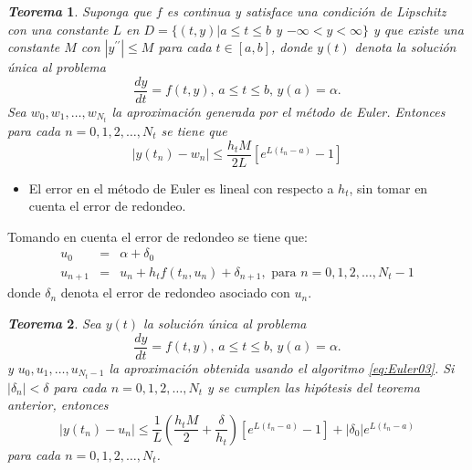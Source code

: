 \documentclass{beamer}
\newtheorem{teorema}{\textit{\textbf{Teorema}}}
\begin{document}
\begin{frame}

\begin{teorema}
Suponga que $f$ es continua y satisface una condición de Lipschitz con una constante $L$ en $D = \{(t,y) | a \leq t \leq b $ y $ -\infty < y < \infty \}$ y que existe una constante $M$ con $|y^{\prime\prime}| \leq M$ para cada $t \in [a,b]$, donde $y(t)$ denota la solución única al problema 
\begin{displaymath}
\dfrac{dy}{dt} = f(t,y), \, a \leq t \leq b, \, y(a) = \alpha .
\end{displaymath}
 Sea $w_0, w_1, \dots, w_{N_t}$ la aproximación generada por el método de Euler. Entonces para cada $n = 0,1,2, \dots , N_t$ se tiene que
\begin{displaymath}
|y(t_n) - w_n| \leq \dfrac{h_t M}{2 L} [e^{L(t_n - a) }-1 ]
\end{displaymath}

\end{teorema}

\begin{itemize}
	\item El error en el método de Euler es lineal con respecto a $h_t$, sin tomar en cuenta el error de redondeo.
\end{itemize}

\end{frame}

\begin{frame}

{\small 
Tomando en cuenta el error de redondeo se tiene que:
\begin{eqnarray}
u_0 & = & \alpha + \delta_0 \nonumber\\
u_{n+1} & = & u_n + h_t f(t_n, u_n) + \delta_{n+1}, \text{ para } n = 0, 1,2, \dots , N_t-1 \label{eq:Euler03}
\end{eqnarray}
donde $\delta_n$ denota el error de redondeo asociado con $u_n$.
}

\begin{teorema}
{\small
Sea $y(t)$ la solución única al problema 
\begin{displaymath}
\dfrac{dy}{dt} = f(t,y), \, a \leq t \leq b, \, y(a) = \alpha .
\end{displaymath}
y $u_0, u_1, \dots, u_{N_t-1}$ la aproximación obtenida usando el algoritmo \eqref{eq:Euler03}. Si $|\delta_n| < \delta$ para cada $n = 0, 1,2, \dots , N_t$ y se cumplen las hipótesis del teorema anterior, entonces
\begin{displaymath}
|y(t_n) - u_n| \leq \dfrac{1}{L} \left( \dfrac{h_t M}{2} + \dfrac{\delta}{h_t} \right) [e^{L(t_n - a) }-1 ] + |\delta_0| e^{L(t_n - a)} 
\end{displaymath}
para cada $n = 0, 1,2, \dots, N_t$.
}
\end{teorema}

\end{frame}
\end{document}

